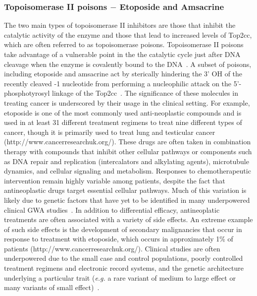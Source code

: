 \documentclass[12pt]{article}
\begin{document}
\subsubsection{Topoisomerase II poisons $-$ Etoposide and Amsacrine}\label{top2inh}

The two main types of topoisomerase II inhibitors are those that inhibit the catalytic activity of the enzyme and those that lead to increased levels of Top2cc, which are often referred to as topoisomerase poisons. Topoisomerase II poisons take advantage of a vulnerable point in the the catalytic cycle just after DNA cleavage when the enzyme is covalently bound to the DNA~\cite{Nitiss:2009kg}. A subset of poisons, including etoposide and amsacrine act by sterically hindering the 3' OH of the recently cleaved -1 nucleotide from performing a nucleophilic attack on the 5'-phosphotyrosyl linkage of the Top2cc~\cite{Wu:2013dia}. The significance of these molecules in treating cancer is underscored by their usage in the clinical setting. For example, etoposide is one of the most commonly used anti-neoplastic compounds and is used in at least 31 different treatment regimens to treat nine different types of cancer, though it is primarily used to treat lung and testicular cancer (http://www.cancerresearchuk.org/). These drugs are often taken in combination therapy with compounds that inhibit other cellular pathways or components such as DNA repair and replication (intercalators and alkylating agents), microtubule dynamics, and cellular signaling and metabolism. Responses to chemotherapeutic intervention remain highly variable among patients, despite the fact that antineoplastic drugs target essential cellular pathways. Much of this variation is likely due to genetic factors that have yet to be identified in many underpowered clinical GWA studies~\cite{Low:2013jw,Huang:2007id}. In addition to differential efficacy, antineoplatic treatments are often associated with a variety of side effects. An extreme example of such side effects is the development of secondary malignancies that occur in response to treatment with etoposide, which occurs in approximately 1\% of patients (http://www.cancerresearchuk.org/). Clinical studies are often underpowered due to the small case and control populations, poorly controlled treatment regimens and electronic record systems, and the genetic architecture underlying a particular trait ({\it e.g.} a rare variant of medium to large effect or many variants of small effect)~\cite{Koboldt:2013kw,Park:2012bz}. 
\vspace{-10pt}
\end{document}

